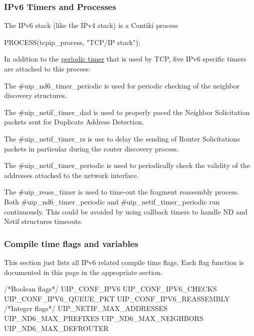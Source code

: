 \hypertarget{a00075_timers}{}\subsubsection{I\+Pv6 Timers and Processes}\label{a00075_timers}
The I\+Pv6 stack (like the I\+Pv4 stack) is a Contiki process 
\begin{DoxyCode}
PROCESS(tcpip\_process, \textcolor{stringliteral}{"TCP/IP stack"});
\end{DoxyCode}
 In addition to the \hyperlink{a00074_mainloop}{periodic timer} that is used by T\+CP, five I\+Pv6 specific timers are attached to this process\+: \begin{DoxyItemize}
\item The \#uip\+\_\+nd6\+\_\+timer\+\_\+periodic is used for periodic checking of the neighbor discovery structures. \item The \#uip\+\_\+netif\+\_\+timer\+\_\+dad is used to properly paced the Neighbor Solicitation packets sent for Duplicate Address Detection. \item The \#uip\+\_\+netif\+\_\+timer\+\_\+rs is use to delay the sending of Router Solicitations packets in particular during the router discovery process. \item The \#uip\+\_\+netif\+\_\+timer\+\_\+periodic is used to periodically check the validity of the addresses attached to the network interface. \item The \#uip\+\_\+reass\+\_\+timer is used to time-\/out the fragment reassembly process. ~\newline
 Both \#uip\+\_\+nd6\+\_\+timer\+\_\+periodic and \#uip\+\_\+netif\+\_\+timer\+\_\+periodic run continuously. This could be avoided by using callback timers to handle ND and Netif structures timeouts.\end{DoxyItemize}


\hypertarget{a00075_compileflags}{}\subsubsection{Compile time flags and variables}\label{a00075_compileflags}
This section just lists all I\+Pv6 related compile time flags. Each flag function is documented in this page in the appropriate section. 
\begin{DoxyCode}
\textcolor{comment}{/*Boolean flags*/}
UIP\_CONF\_IPV6        
UIP\_CONF\_IPV6\_CHECKS
UIP\_CONF\_IPV6\_QUEUE\_PKT 
UIP\_CONF\_IPV6\_REASSEMBLY        
\textcolor{comment}{/*Integer flags*/}
UIP\_NETIF\_MAX\_ADDRESSES 
UIP\_ND6\_MAX\_PREFIXES   
UIP\_ND6\_MAX\_NEIGHBORS   
UIP\_ND6\_MAX\_DEFROUTER  
\end{DoxyCode}




